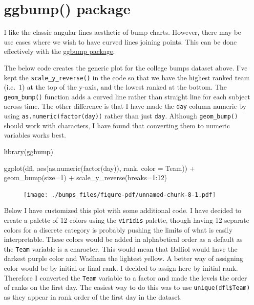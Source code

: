 \documentclass[
  letterpaper,
  DIV=11,
  numbers=noendperiod]{scrreprt}
\newenvironment{Shaded}{\begin{snugshade}}{\end{snugshade}}
\newcommand{\AttributeTok}[1]{\textcolor[rgb]{0.40,0.45,0.13}{#1}}
\newcommand{\DecValTok}[1]{\textcolor[rgb]{0.68,0.00,0.00}{#1}}
\newcommand{\FunctionTok}[1]{\textcolor[rgb]{0.28,0.35,0.67}{#1}}
\newcommand{\NormalTok}[1]{\textcolor[rgb]{0.00,0.23,0.31}{#1}}
\newcommand{\SpecialCharTok}[1]{\textcolor[rgb]{0.37,0.37,0.37}{#1}}
\begin{document}
\hypertarget{ggbump-package}{%
\section{ggbump() package}\label{ggbump-package}}

I like the classic angular lines aesthetic of bump charts. However,
there may be use cases where we wish to have curved lines joining
points. This can be done effectively with the
\href{https://github.com/davidsjoberg/ggbump}{ggbump package}.

The below code creates the generic plot for the college bumps dataset
above. I've kept the \texttt{scale\_y\_reverse()} in the code so that we
have the highest ranked team (i.e.~1) at the top of the y-axis, and the
lowest ranked at the bottom. The \texttt{geom\_bump()} function adds a
curved line rather than straight line for each subject across time. The
other difference is that I have made the \texttt{day} column numeric by
using \texttt{as.numeric(factor(day))} rather than just \texttt{day}.
Although \texttt{geom\_bump()} should work with characters, I have found
that converting them to numeric variables works best.

\begin{Shaded}
\begin{Highlighting}[]
\FunctionTok{library}\NormalTok{(ggbump)}

\FunctionTok{ggplot}\NormalTok{(dfl, }\FunctionTok{aes}\NormalTok{(}\FunctionTok{as.numeric}\NormalTok{(}\FunctionTok{factor}\NormalTok{(day)), rank, }\AttributeTok{color =}\NormalTok{ Team)) }\SpecialCharTok{+}
    \FunctionTok{geom\_bump}\NormalTok{(}\AttributeTok{size=}\DecValTok{1}\NormalTok{) }\SpecialCharTok{+}
    \FunctionTok{scale\_y\_reverse}\NormalTok{(}\AttributeTok{breaks=}\DecValTok{1}\SpecialCharTok{:}\DecValTok{12}\NormalTok{) }
\end{Highlighting}
\end{Shaded}

\begin{figure}[H]

{\centering \texttt{[image: ./bumps\_files/figure-pdf/unnamed-chunk-8-1.pdf]}

}

\end{figure}

Below I have customized this plot with some additional code. I have
decided to create a palette of 12 colors using the \texttt{viridis}
palette, though having 12 separate colors for a discrete category is
probably pushing the limits of what is easily interpretable. These
colors would be added in alphabetical order as a default as the
\texttt{Team} variable is a character. This would mean that Balliol
would have the darkest purple color and Wadham the lightest yellow. A
better way of assigning color would be by initial or final rank. I
decided to assign here by initial rank. Therefore I converted the
\texttt{Team} variable to a factor and made the levels the order of
ranks on the first day. The easiest way to do this was to use
\texttt{unique(dfl\$Team)} as they appear in rank order of the first day
in the dataset.
\end{document}
